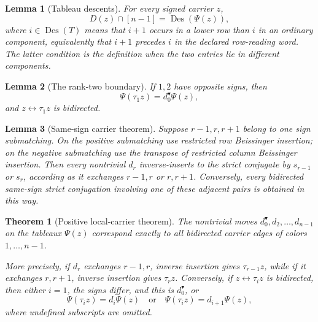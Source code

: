 \documentclass[10pt,a4paper]{amsart}
\newtheorem{theorem}{Theorem}
\newtheorem{lemma}{Lemma}
\newcommand{\Des}{\operatorname{Des}}
\begin{document}
\begin{lemma}[Tableau descents]
\label{lem:tableau-descents}
For every signed carrier $z$,
\[
                     D(z)\cap[n-1]=\Des(\Psi(z)),
\]
where $i\in\Des(T)$ means that $i+1$ occurs in a lower row than $i$ in
an ordinary component, equivalently that $i+1$ precedes $i$ in the
declared row-reading word.  The latter condition is the definition when
the two entries lie in different components.
\end{lemma}

\begin{lemma}[The rank-two boundary]
\label{lem:boundary}
If $1,2$ have opposite signs, then
\[
                     \Psi(\tau_1z)=d_0^{\blacktriangledown}\Psi(z),
\]
and $z\leftrightarrow\tau_1z$ is bidirected.
\end{lemma}

\begin{lemma}[Same-sign carrier theorem]
\label{lem:same-sign}
Suppose $r-1,r,r+1$ belong to one sign submatching.  On the positive
submatching use restricted row Beissinger insertion; on the negative
submatching use the transpose of restricted column Beissinger insertion.
Then every nontrivial $d_r$ inverse-inserts to the strict conjugate by
$s_{r-1}$ or $s_r$, according as it exchanges $r-1,r$ or $r,r+1$.
Conversely, every bidirected same-sign strict conjugation involving one of
these adjacent pairs is obtained in this way.
\end{lemma}

\begin{theorem}[Positive local-carrier theorem]
\label{thm:positive-local}
The nontrivial moves $d_0^{\blacktriangledown},d_2,\ldots,d_{n-1}$ on the
tableaux $\Psi(z)$ correspond exactly to all bidirected carrier edges of
colors $1,\ldots,n-1$.

More precisely, if $d_r$ exchanges $r-1,r$, inverse insertion gives
$\tau_{r-1}z$, while if it exchanges $r,r+1$, inverse insertion gives
$\tau_rz$.  Conversely, if $z\leftrightarrow\tau_i z$ is bidirected,
then either $i=1$, the signs differ, and this is $d_0^{\blacktriangledown}$, or
\[
 \Psi(\tau_i z)=d_i\Psi(z)
 \quad\text{or}\quad
 \Psi(\tau_i z)=d_{i+1}\Psi(z),
\]
where undefined subscripts are omitted.
\end{theorem}
\end{document}
